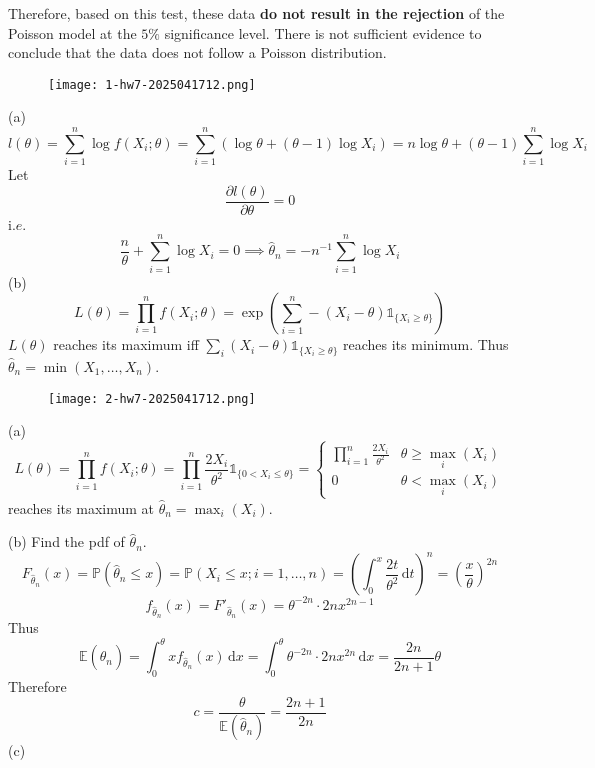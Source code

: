 Therefore, based on this test, these data \textbf{do not result in the rejection} of the Poisson model at the $5\%$ significance level. There is not sufficient evidence to conclude that the data does not follow a Poisson distribution.

\begin{exercise}
\begin{figure}[H]
\centering
\texttt{[image: 1-hw7-2025041712.png]}
\label{}
\end{figure}
\end{exercise}
(a)
\[
l(\theta)=\sum_{i=1}^{n} \log f(X_i;\theta)= \sum_{i=1}^{n} (\log\theta+(\theta-1)\log X_i)=n\log\theta+(\theta-1)\sum_{i=1}^{n} \log X_i
\]
Let
\[
\frac{ \partial l(\theta) }{ \partial \theta } =0
\]
i.$e$.
\[
\frac{n}{\theta}+\sum_{i=1}^{n} \log X_i=0\implies\widehat{\theta}_n=-n^{-1}\sum_{i=1}^{n} \log X_i
\]
(b)
\[
L(\theta)=\prod_{i=1}^{n} f(X_i;\theta)=\exp\left( \sum_{i=1}^{n} -(X_i-\theta)\mathbb{1}_{\{ X_i\geq \theta \}} \right)
\]
$L(\theta)$ reaches its maximum iff $\sum_{i}(X_i-\theta)\mathbb{1}_{\{ X_i\geq\theta \}}$ reaches its minimum. Thus $\widehat{\theta}_n=\min(X_1,\dots,X_n)$.

\begin{exercise}
\begin{figure}[H]
\centering
\texttt{[image: 2-hw7-2025041712.png]}
\label{}
\end{figure}
\end{exercise}
(a)
\[
L(\theta)=\prod_{i=1}^{n} f(X_i;\theta)=\prod_{i=1}^{n} \frac{2X_i}{\theta^{2}}\mathbb{1}_{\{ 0<X_i\leq \theta \}}=\begin{cases}
\prod_{i=1}^{n} \frac{2X_i}{\theta^{2}} & \theta\geq \max_{i}(X_i) \\
0 & \theta<\max_{i}(X_i)
\end{cases}
\]
reaches its maximum at $\widehat{\theta}_n=\max_{i}(X_i)$.

(b)
Find the pdf of $\widehat{\theta}_n$.
\[
F_{\widehat{\theta}_n}(x)=\mathbb{P}(\widehat{\theta}_n\leq x)=\mathbb{P}(X_i\leq x;i=1,\dots,n)=\left( \int_{0}^{x} \frac{2t}{\theta^{2}} \, \mathrm{d}t  \right)^{n}=\left( \frac{x}{\theta} \right)^{2n}
\]
\[
f_{\widehat{\theta}_n}(x)=F'_{\widehat{\theta}_n}(x)=\theta^{-2n}\cdot2nx^{2n-1}
\]
Thus
\[
\mathbb{E}(\widehat{\theta}_n)=\int_{0}^{\theta} xf_{\widehat{\theta}_n}(x) \, \mathrm{d}x =\int_{0}^{\theta} \theta^{-2n}\cdot2nx^{2n} \, \mathrm{d}x =\frac{2n}{2n+1}\theta
\]
Therefore
\[
c=\frac{\theta}{\mathbb{E}(\widehat{\theta}_n)}=\frac{2n+1}{2n}
\]
(c)

